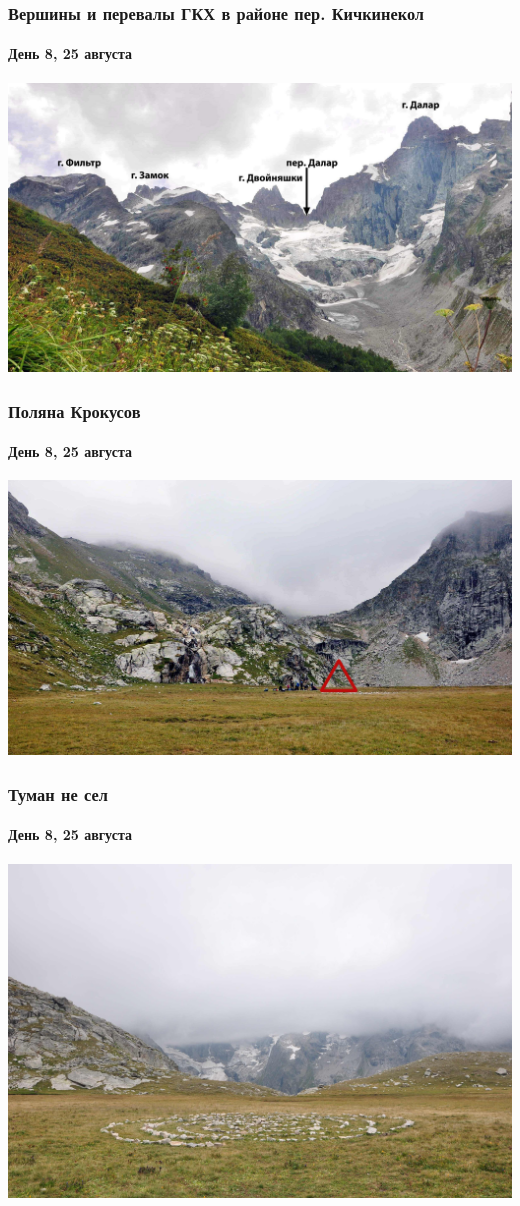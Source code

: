 \begin{frame}
	\frametitle{Вершины и перевалы ГКХ в районе пер. Кичкинекол}
	\framesubtitle{День 8, 25 августа}
	\centering
	\includegraphics[width=\textwidth]{../pics/DSC_0158}			
\end{frame}

\begin{frame}
	\frametitle{Поляна Крокусов}
	\framesubtitle{День 8, 25 августа}
	\centering
	\includegraphics[width=\textwidth]{../pics/DSC_0177}			
\end{frame}

\begin{frame}
	\frametitle{Туман \textbf{не} сел}
	\framesubtitle{День 8, 25 августа}
	\centering
	\includegraphics[width=\textwidth]{../pics/DSC_0179}			
\end{frame}

